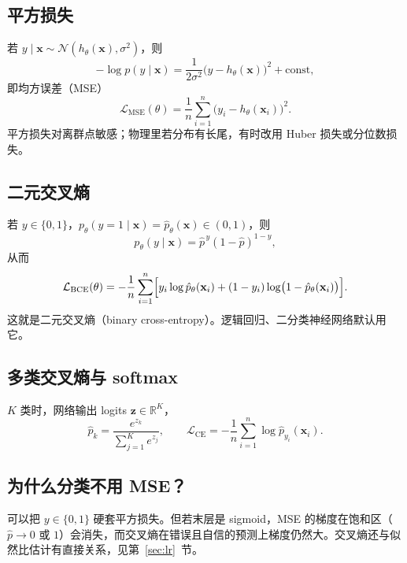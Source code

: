 \documentclass[11pt,a4paper]{article}
\theoremstyle{definition}
\theoremstyle{plain}
\theoremstyle{remark}
\newcommand{\R}{\mathbb{R}}
\newcommand{\loss}{\mathcal{L}}
\begin{document}
\subsection{平方损失}

若 $y\mid\mathbf{x}\sim\mathcal{N}(h_\theta(\mathbf{x}),\sigma^2)$，则
\begin{equation}
  -\log p(y\mid\mathbf{x})=\frac{1}{2\sigma^2}\bigl(y-h_\theta(\mathbf{x})\bigr)^2+\text{const},
\end{equation}
即均方误差（MSE）
\begin{equation}
  \loss_{\mathrm{MSE}}(\theta)=\frac{1}{n}\sum_{i=1}^n \bigl(y_i-h_\theta(\mathbf{x}_i)\bigr)^2.
\end{equation}
平方损失对离群点敏感；物理里若分布有长尾，有时改用 Huber 损失或分位数损失。

\subsection{二元交叉熵}

若 $y\in\{0,1\}$，$p_\theta(y=1\mid\mathbf{x})=\hat p_\theta(\mathbf{x})\in(0,1)$，则
\begin{equation}
  p_\theta(y\mid\mathbf{x})=\hat p^{\,y}(1-\hat p)^{1-y},
\end{equation}
从而
\begin{equation}
\label{eq:bce}
  \loss_{\mathrm{BCE}}(\theta)=-\frac{1}{n}\sum_{i=1}^n \Bigl[
    y_i\log\hat p_\theta(\mathbf{x}_i)+(1-y_i)\log\bigl(1-\hat p_\theta(\mathbf{x}_i)\bigr)
  \Bigr].
\end{equation}
这就是二元交叉熵（binary cross-entropy）。逻辑回归、二分类神经网络默认用它。

\subsection{多类交叉熵与 softmax}

$K$ 类时，网络输出 logits $\mathbf{z}\in\R^K$，
\begin{equation}
\label{eq:softmax}
  \hat p_k=\frac{e^{z_k}}{\sum_{j=1}^K e^{z_j}},\qquad
  \loss_{\mathrm{CE}}=-\frac{1}{n}\sum_{i=1}^n \log \hat p_{y_i}(\mathbf{x}_i).
\end{equation}

\subsection{为什么分类不用 MSE？}

可以把 $y\in\{0,1\}$ 硬套平方损失。但若末层是 sigmoid，MSE 的梯度在饱和区（$\hat p\to 0$ 或 $1$）会消失，而交叉熵在错误且自信的预测上梯度仍然大。交叉熵还与似然比估计有直接关系，见第~\ref{sec:lr}~节。
\end{document}
